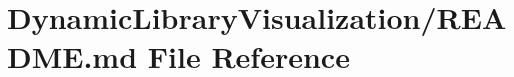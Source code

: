 \hypertarget{_dynamic_library_visualization_2_r_e_a_d_m_e_8md}{}\section{Dynamic\+Library\+Visualization/\+R\+E\+A\+D\+ME.md File Reference}
\label{_dynamic_library_visualization_2_r_e_a_d_m_e_8md}
